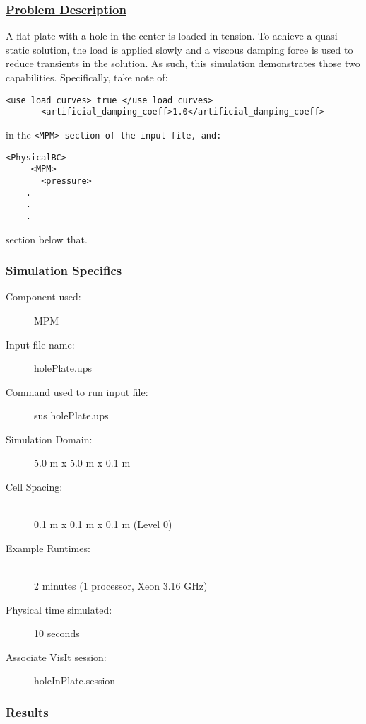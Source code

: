 \subsubsection*{\underline{Problem Description}}
A flat plate with a hole in the center is loaded in tension.  To achieve a
quasi-static solution, the load is applied slowly and a viscous damping force
is used to reduce transients in the solution.  As such, this simulation
demonstrates those two capabilities.  Specifically, take note of:
\begin{Verbatim}[fontsize=\footnotesize]
       <use_load_curves> true </use_load_curves>
       <artificial_damping_coeff>1.0</artificial_damping_coeff>
\end{Verbatim}
in the \tt <MPM> \normalfont section of the input file, and:
\begin{Verbatim}[fontsize=\footnotesize]
   <PhysicalBC>
     <MPM>
       <pressure>
	.
	.
	.
\end{Verbatim}
section below that.

 
\subsubsection*{\underline{Simulation Specifics}}
\begin{description} 
\item [Component used:] \hfill MPM
\item [Input file name:] \hfill holePlate.ups
\item [Command used to run input file:]\hfill sus holePlate.ups
\item [Simulation Domain:]\hfill 5.0 m x 5.0 m x 0.1 m

\item [Cell Spacing:]\hfill \\ 
  0.1 m x 0.1 m x 0.1 m (Level 0)

\item [Example Runtimes:] \hfill \\
 2 minutes  (1 processor, Xeon 3.16 GHz)\\

\item [Physical time simulated:] \hfill 10 seconds

\item [Associate VisIt session:] \hfill holeInPlate.session

\end{description}

\subsubsection*{\underline{Results}}

